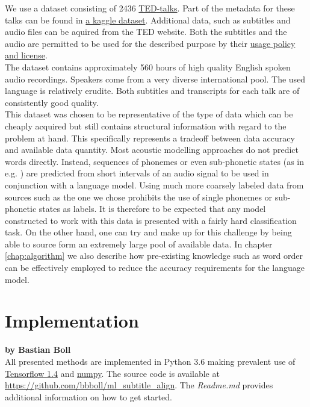 We use a dataset consisting of 2436 \href{https://www.ted.com}{TED-talks}. Part of the metadata for these talks can be found in \href{https://www.kaggle.com/rounakbanik/ted-talks}{a kaggle dataset}. Additional data, such as subtitles and audio files can be aquired from the TED website. Both the subtitles and the audio are permitted to be used for the described purpose by their \href{https://www.ted.com/about/our-organization/our-policies-terms/ted-talks-usage-policy}{usage policy and license}.\\
The dataset contains approximately 560 hours of high quality English spoken audio recordings. Speakers come from a very diverse international pool. The used language is relatively erudite. Both subtitles and transcripts for each talk are of consistently good quality.\\
This dataset was chosen to be representative of the type of data which can be cheaply acquired but still contains structural information with regard to the problem at hand. This specifically represents a tradeoff between data accuracy and available data quantity. Most acoustic modelling approaches do not predict words directly. Instead, sequences of phonemes or even sub-phonetic states (as in e.g. \cite{maas2015building}) are predicted from short intervals of an audio signal to be used in conjunction with a language model. Using much more coarsely labeled data from sources such as the one we chose prohibits the use of single phonemes or sub-phonetic states as labels. It is therefore to be expected that any model constructed to work with this data is presented with a fairly hard classification task. On the other hand, one can try and make up for this challenge by being able to source form an extremely large pool of available data. In chapter \ref{chap:algorithm} we also describe how pre-existing knowledge such as word order can be effectively employed to reduce the accuracy requirements for the language model.

\section{Implementation}

\textbf{by Bastian Boll} \\

All presented methods are implemented in Python 3.6 making prevalent use of \href{https://www.tensorflow.org/}{Tensorflow 1.4} and \href{http://www.numpy.org/}{numpy}. The source code is available at \url{https://github.com/bbboll/ml_subtitle_align}. The \emph{Readme.md} provides additional information on how to get started.